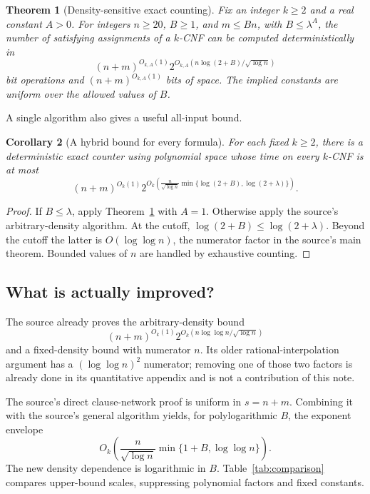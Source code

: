 \documentclass[11pt]{article}
\newtheorem{theorem}{Theorem}[section]
\newtheorem{corollary}[theorem]{Corollary}
\theoremstyle{remark}
\begin{document}
\begin{theorem}[Density-sensitive exact counting]\label{thm:density}
Fix an integer \(k\ge2\) and a real constant \(A>0\).
For integers \(n\ge20\), \(B\ge1\), and \(m\le Bn\), with
\(B\le\lambda^A\), the number of satisfying assignments of a \(k\)-CNF
can be computed deterministically in
\begin{equation}\label{eq:density}
 (n+m)^{O_{k,A}(1)}
 2^{O_{k,A}\!\left(n\log(2+B)/\sqrt{\log n}\right)}
\end{equation}
bit operations and \((n+m)^{O_{k,A}(1)}\) bits of space.
The implied constants are uniform over the allowed values of \(B\).
\end{theorem}

A single algorithm also gives a useful all-input bound.

\begin{corollary}[A hybrid bound for every formula]\label{cor:hybrid}
For each fixed \(k\ge2\), there is a deterministic exact counter using
polynomial space whose time on every \(k\)-CNF is at most
\begin{equation}\label{eq:hybrid}
 (n+m)^{O_k(1)}
 2^{O_k\!\left(
 \frac{n}{\sqrt{\log n}}
 \min\{\log(2+B),\log(2+\lambda)\}\right)}.
\end{equation}
\end{corollary}
\begin{proof}
If \(B\le\lambda\), apply Theorem~\ref{thm:density} with \(A=1\).
Otherwise apply the source's arbitrary-density algorithm. At the cutoff,
\(\log(2+B)\le\log(2+\lambda)\). Beyond the cutoff the latter is
\(O(\log\log n)\), the numerator factor in the source's main theorem.
Bounded values of \(n\) are handled by exhaustive counting.
\end{proof}

\subsection{What is actually improved?}
The source already proves the arbitrary-density bound
\[
 (n+m)^{O_k(1)}
 2^{O_k(n\log\log n/\sqrt{\log n})}
\]
and a fixed-density bound with numerator \(n\).
Its older rational-interpolation argument has a
\((\log\log n)^2\) numerator; removing one of those two factors is
already done in its quantitative appendix and is not a contribution
of this note.

The source's direct clause-network proof is uniform in
\(s=n+m\). Combining it with the source's general algorithm yields,
for polylogarithmic \(B\), the exponent envelope
\begin{equation}\label{eq:old-envelope}
 O_k\!\left(\frac{n}{\sqrt{\log n}}
            \min\{1+B,\log\log n\}\right).
\end{equation}
The new density dependence is logarithmic in \(B\).
Table~\ref{tab:comparison} compares upper-bound scales, suppressing
polynomial factors and fixed constants.
\end{document}
